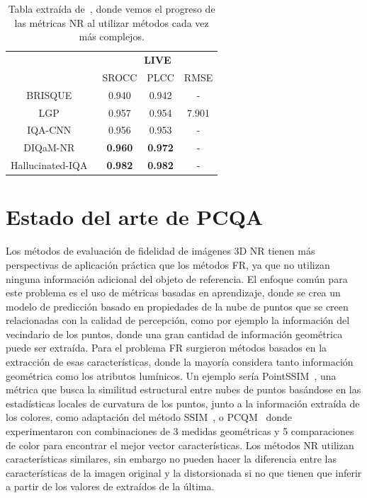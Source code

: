\begin{table}[htp]
  \tiny
    \centering
    \begin{tabular}{|c|c|c|c|}
    \hline 
    \rowcolor[HTML]{FFC702}
    \cellcolor[HTML]{FFC702} & \multicolumn{3}{c|}{\cellcolor[HTML]{FFC702}\textbf{LIVE}} \\ \cline{2-4}
    \rowcolor[HTML]{FFC702}
      \multirow{-2}{*}{\textbf{Métrica}} & SROCC & PLCC & RMSE \\
    \hline
                          BRISQUE~\cite{BRISQUE} & 0.940 & 0.942 & - \\
                           LGP~\cite{LGP} & 0.957 & 0.954 & 7.901 \\
                           IQA-CNN~\cite{IQA-CNN} & 0.956 & 0.953 & - \\
                           DIQaM-NR~\cite{DIQaM} & \textbf{0.960} & \textbf{0.972} & - \\
                           Hallucinated-IQA~\cite{Hallucinated-IQA} & \textbf{0.982} & \textbf{0.982} & - \\
                          \hline
  \end{tabular}
  \caption[Tablas estado del arte NR-IQA.]{Tabla extraída de~\cite{SurveyOf2D3DMetrics}, 
    donde vemos el progreso de las métricas NR al utilizar métodos cada vez más complejos.}
  \label{tab:SOTANRIQA}
\end{table}

\section{Estado del arte de PCQA}
Los métodos de evaluación de fidelidad de imágenes 3D NR tienen más perspectivas 
de aplicación práctica que los métodos FR, ya que no utilizan ninguna información 
adicional del objeto de referencia.
El enfoque común para este problema es el uso de métricas basadas en 
aprendizaje, donde se crea un modelo de predicción basado en propiedades de la 
nube de puntos que se creen relacionadas con la calidad de percepción, 
como por ejemplo la información del vecindario de los puntos, 
donde una gran cantidad de información geométrica 
puede ser extraída. 
Para el problema FR surgieron métodos basados en la extracción 
de esas características, donde la 
mayoría considera tanto información geométrica como los atributos lumínicos.
Un ejemplo sería PointSSIM~\cite{PointSSIM}, una métrica que busca la similitud estructural entre nubes de puntos basándose en
las estadísticas locales de curvatura de los puntos, junto a la información 
extraída de los colores, como adaptación del método SSIM~\cite{SSIM}, o 
PCQM~\cite{PCQM} donde experimentaron con combinaciones de 3 medidas geométricas 
y 5 comparaciones de color para encontrar el mejor vector características.
Los métodos NR utilizan características similares, sin embargo no pueden 
hacer la diferencia entre las características de la imagen original y la 
distorsionada si no que tienen que inferir a partir de los valores de extraídos 
de la última.

